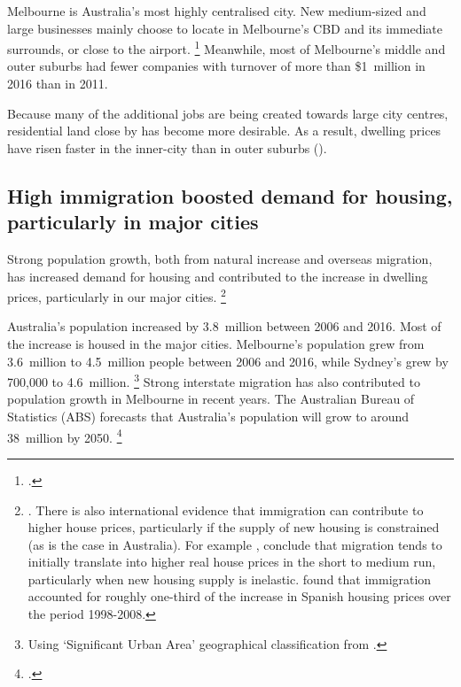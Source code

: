 Melbourne is Australia's most highly centralised city.
New medium-sized and large businesses mainly choose to locate in Melbourne's CBD and its immediate surrounds, or close to the airport.%
	\footcite{Rasmussen-economic-geography}
Meanwhile, most of Melbourne's middle and outer suburbs had fewer companies with turnover of more than \$1~million in 2016 than in 2011.

Because many of the additional jobs are being created towards large city centres, residential land close by has become more desirable.
As a result, dwelling prices have risen faster in the inner-city than in outer suburbs ().

\subsection{High immigration boosted demand for housing, particularly in major cities }\label{subsec:high-immigration-boosted-demand-for-housing-particularly-in-major-cities}
\CenturyFootnote

Strong population growth, both from natural increase and overseas migration, has increased demand for housing and contributed to the increase in dwelling prices, particularly in our major cities.%
    \footnote{\textcites{RBA2015SubmissionHomeOwnershipInquiry}{CommissionMigrantIntake2016}. There is also international evidence that immigration can contribute to higher house prices, particularly if the supply of new housing is constrained (as is the case in Australia). For example%
    , \textcite{AndrewsEtAlHousing} conclude that migration tends to initially translate into higher real house
prices in the short to medium run, particularly when new housing supply is inelastic. \textcite{Gonzalez_2013_spain_house_prices} found that immigration accounted for roughly one-third of the increase in Spanish housing prices over the period 1998-2008.}

Australia's population increased by 3.8~million between 2006 and 2016.
Most of the increase is housed in the major cities.
Melbourne's population grew from 3.6~million to 4.5~million people between 2006 and 2016, while Sydney's grew by 700,000 to 4.6~million.%
    \footnote{Using `Significant Urban Area' geographical classification from \textcite{ABS-2017-regionalpopgrowth}.}
Strong interstate migration has also contributed to population growth in Melbourne in recent years.
The Australian Bureau of Statistics (ABS) forecasts that Australia's population will grow to around 38~million by 2050.%
	\footcite[][Series~B]{ABS2013PopulationprojectionsAustralia}

